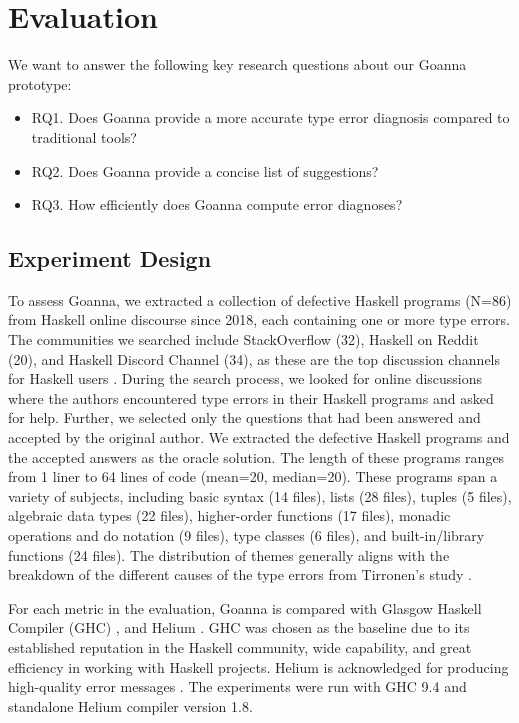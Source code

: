     \section{Evaluation} \label{sec:evaluation}

     We want to answer the following key research questions about our Goanna prototype:

    \begin{itemize}
        \item RQ1. Does Goanna provide a more accurate type error diagnosis compared to traditional tools?
        \item RQ2. Does Goanna provide a concise list of suggestions?
        \item RQ3. How efficiently does Goanna compute error diagnoses?
    \end{itemize}

    \subsection{Experiment Design} \label{sub:dataset}

    To assess Goanna, we extracted a collection of defective Haskell programs (N=86) from Haskell online discourse since 2018, each containing one or more type errors. The communities we searched include StackOverflow (32), Haskell on Reddit (20), and Haskell Discord Channel (34), as these are the top discussion channels for Haskell users \cite{Fausak2022-zf}. During the search process, we looked for online discussions where the authors encountered type errors in their Haskell programs and asked for help. Further, we selected only the questions that had been answered and accepted by the original author. We extracted the defective Haskell programs and the accepted answers as the oracle solution. The length of these programs ranges from 1 liner to 64 lines of code (mean=20, median=20). These programs span a variety of subjects, including basic syntax (14 files), lists (28 files), tuples (5 files), algebraic data types (22 files), higher-order functions (17 files), monadic operations and do notation (9 files), type classes (6 files), and built-in/library functions (24 files). The distribution of themes generally aligns with the breakdown of the different causes of the type errors from Tirronen's study \cite{Tirronen2015-nr}.
    
    	For each metric in the evaluation, Goanna is compared with Glasgow Haskell Compiler (GHC) \cite{Gamari_undated-zu}, and Helium \cite{Hage2023-kk}. GHC was chosen as the baseline due to its established reputation in the Haskell community, wide capability, and great efficiency in working with Haskell projects. Helium is acknowledged for producing high-quality error messages \cite{Heeren2003-kd}. The experiments were run with GHC 9.4 and standalone Helium compiler version 1.8.
    
